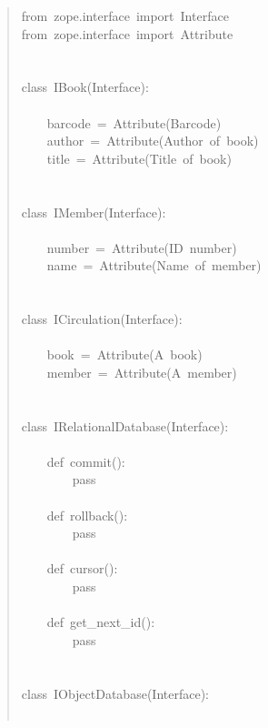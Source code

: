 \documentclass[14pt,a4paper,openany,twoside,final]{extbook}
\begin{document}
\begin{quote}{\ttfamily \raggedright \noindent
from~zope.interface~import~Interface\\
from~zope.interface~import~Attribute\\
~\\
~\\
class~IBook(Interface):\\
~\\
~~~~barcode~=~Attribute(\textquotedbl{}Barcode\textquotedbl{})\\
~~~~author~=~Attribute(\textquotedbl{}Author~of~book\textquotedbl{})\\
~~~~title~=~Attribute(\textquotedbl{}Title~of~book\textquotedbl{})\\
~\\
~\\
class~IMember(Interface):\\
~\\
~~~~number~=~Attribute(\textquotedbl{}ID~number\textquotedbl{})\\
~~~~name~=~Attribute(\textquotedbl{}Name~of~member\textquotedbl{})\\
~\\
~\\
class~ICirculation(Interface):\\
~\\
~~~~book~=~Attribute(\textquotedbl{}A~book\textquotedbl{})\\
~~~~member~=~Attribute(\textquotedbl{}A~member\textquotedbl{})\\
~\\
~\\
class~IRelationalDatabase(Interface):\\
~\\
~~~~def~commit():\\
~~~~~~~~pass\\
~\\
~~~~def~rollback():\\
~~~~~~~~pass\\
~\\
~~~~def~cursor():\\
~~~~~~~~pass\\
~\\
~~~~def~get\_next\_id():\\
~~~~~~~~pass\\
~\\
~\\
class~IObjectDatabase(Interface):\\
~\\
}
\end{quote}
\end{document}
